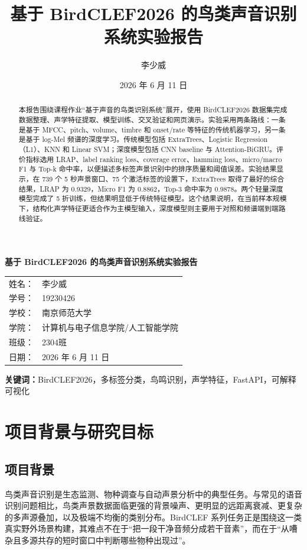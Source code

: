 \documentclass[12pt,a4paper]{article}
\title{基于 BirdCLEF2026 的鸟类声音识别系统实验报告}
\author{李少威}
\date{2026 年 6 月 11 日}
\begin{document}
\begin{titlepage}
\centering
\vspace*{2.8cm}
{\LARGE\bfseries 基于 BirdCLEF2026 的鸟类声音识别系统实验报告\par}
\vspace{2.2cm}
{\large
\begin{tabular}{rl}
姓名： & 李少威 \\
学号： & 19230426 \\
学校： & 南京师范大学 \\
学院： & 计算机与电子信息学院/人工智能学院 \\
班级： & 2304班 \\
日期： & 2026 年 6 月 11 日 \\
\end{tabular}
}
\vfill
\end{titlepage}

\begin{abstract}
本报告围绕课程作业“基于声音的鸟类识别系统”展开，使用 BirdCLEF2026 数据集完成数据整理、声学特征提取、模型训练、交叉验证和网页演示。实验采用两条路线：一条是基于 MFCC、pitch、volume、timbre 和 onset/rate 等特征的传统机器学习，另一条是基于 log-Mel 频谱的深度学习。传统模型包括 ExtraTrees、Logistic Regression（L1）、KNN 和 Linear SVM；深度模型包括 CNN baseline 与 Attention-BiGRU。评价指标选用 LRAP、label ranking loss、coverage error、hamming loss、micro/macro F1 与 Top-k 命中率，以便描述多标签声景识别中的排序质量和阈值误差。实验结果显示，在 739 个 5 秒声景窗口、75 个激活标签的设置下，ExtraTrees 取得了最好的综合结果，LRAP 为 0.9329，Micro F1 为 0.8862，Top-3 命中率为 0.9878。两个轻量深度模型完成了 5 折训练，但结果明显低于传统特征模型。这个结果说明，在当前样本规模下，结构化声学特征更适合作为主模型输入，深度模型则主要用于对照和频谱端到端路线验证。
\end{abstract}

\noindent\textbf{关键词：}BirdCLEF2026，多标签分类，鸟鸣识别，声学特征，FastAPI，可解释可视化

\tableofcontents
\newpage

\section{项目背景与研究目标}

\subsection{项目背景}
鸟类声音识别是生态监测、物种调查与自动声景分析中的典型任务。与常见的语音识别问题相比，鸟类声景数据面临更强的背景噪声、更明显的远距离衰减、更复杂的多声源叠加，以及极端不均衡的类别分布。BirdCLEF 系列任务正是围绕这一类真实野外场景构建，其难点不在于“把一段干净音频分成若干音素”，而在于“从嘈杂且多源共存的短时窗口中判断哪些物种出现过”。
\end{document}
